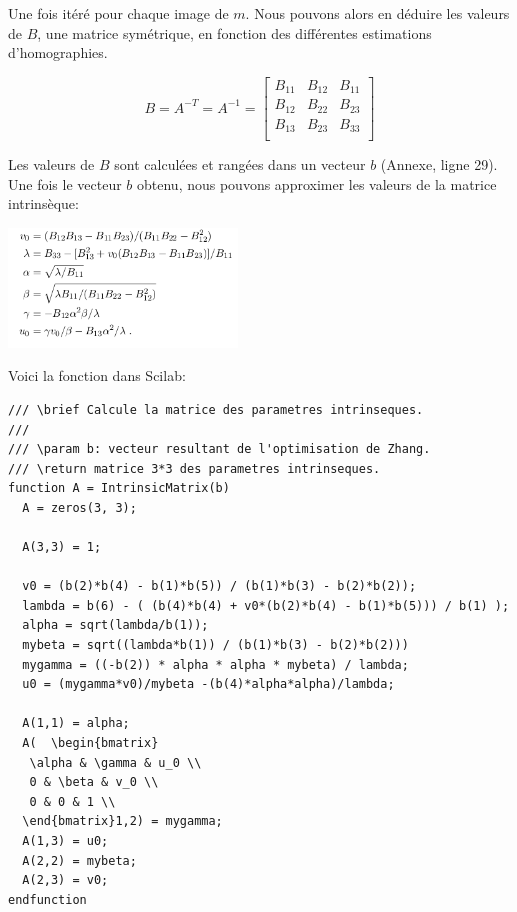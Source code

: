 \documentclass[a4paper,11pt]{article}
\begin{document}
Une fois itéré pour chaque image de $m$. Nous pouvons alors en déduire les 
valeurs de $B$, une matrice symétrique, en fonction des différentes estimations 
d'homographies.

\begin{equation}
  B = A^{-T} = A^{-1} =
  \begin{bmatrix}
    B_{11} & B_{12} & B_{11} \\
    B_{12} & B_{22} & B_{23} \\
    B_{13} & B_{23} & B_{33} \\
  \end{bmatrix}
\end{equation}

Les valeurs de $B$ sont calculées et rangées dans un vecteur $b$ (Annexe, ligne 29).\\

Une fois le vecteur $b$ obtenu, nous pouvons approximer les valeurs de la matrice intrinsèque:

\begin{center}
  \includegraphics[width=230px]{annexe_b.png}
\end{center}

Voici la fonction dans Scilab:

\begin{lstlisting}[caption=Fonction d'approximation de la matrice intrinsèque à partir de b]
/// \brief Calcule la matrice des parametres intrinseques.
///
/// \param b: vecteur resultant de l'optimisation de Zhang.
/// \return matrice 3*3 des parametres intrinseques.
function A = IntrinsicMatrix(b)
  A = zeros(3, 3);
  
  A(3,3) = 1;
  
  v0 = (b(2)*b(4) - b(1)*b(5)) / (b(1)*b(3) - b(2)*b(2));
  lambda = b(6) - ( (b(4)*b(4) + v0*(b(2)*b(4) - b(1)*b(5))) / b(1) );
  alpha = sqrt(lambda/b(1));
  mybeta = sqrt((lambda*b(1)) / (b(1)*b(3) - b(2)*b(2)))
  mygamma = ((-b(2)) * alpha * alpha * mybeta) / lambda;
  u0 = (mygamma*v0)/mybeta -(b(4)*alpha*alpha)/lambda;
  
  A(1,1) = alpha;
  A(  \begin{bmatrix}
   \alpha & \gamma & u_0 \\
   0 & \beta & v_0 \\
   0 & 0 & 1 \\
  \end{bmatrix}1,2) = mygamma;
  A(1,3) = u0;
  A(2,2) = mybeta;
  A(2,3) = v0;
endfunction
\end{lstlisting}
\end{document}
